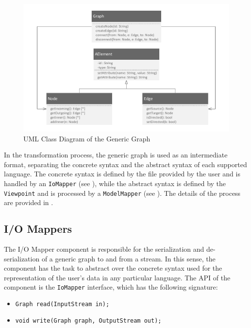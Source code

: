 \begin{figure}[h]
\centering
\includegraphics[scale=0.75]{figures/graph.pdf}
\caption{UML Class Diagram of the Generic Graph}
\label{fig:genericgraph}
\end{figure}

In the transformation process, the generic graph is used as an intermediate format, separating the concrete syntax and the abstract syntax of each supported language. The concrete syntax is defined by the file provided by the user and is handled by an \texttt{IoMapper} (see ), while the abstract syntax is defined by the \texttt{Viewpoint} and is processed by a \texttt{ModelMapper} (see ). The details of the process are provided in .

\subsection{I/O Mappers}
\label{sec:impl:comp:io}

The I/O Mapper component is responsible for the serialization and de-serialization of a generic graph to and from a stream. In this sense, the component has the task to abstract over the concrete syntax used for the representation of the user's data in any particular language. The API of the component is the \texttt{IoMapper} interface, which has the following signature:

\begin{itemize}
\item \texttt{Graph read(InputStream in);}
\item \texttt{void write(Graph graph, OutputStream out);}
\end{itemize}


